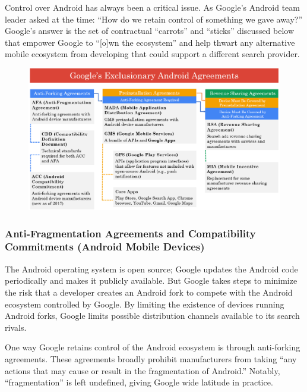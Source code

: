 \documentclass[11pt,b5paper,headings=small]{scrartcl}
\begin{document}

Control over Android has always been a critical issue. As Google’s Android team
leader asked at the time: “How do we retain control of something we gave away?” Google’s
answer is the set of contractual “carrots” and “sticks” discussed below that empower Google to
“[o]wn the ecosystem” and help thwart any alternative mobile ecosystem from developing that
could support a different search provider.
\begin{figure}
\caption{}
\includegraphics{US-v-Google-Complaint-figures/fig5.png}
\end{figure}




\subsubsection{Anti-Fragmentation Agreements and Compatibility Commitments
(Android Mobile Devices)}
The Android operating system is open source; Google updates the Android code
periodically and makes it publicly available. But Google takes steps to minimize the risk that a
developer creates an Android fork to compete with the Android ecosystem controlled by Google.
By limiting the existence of devices running Android forks, Google limits possible distribution
channels available to its search rivals.


One way Google retains control of the Android ecosystem is through anti-forking
agreements. These agreements broadly prohibit manufacturers from taking “any actions that may
cause or result in the fragmentation of Android.” Notably, “fragmentation” is left undefined,
giving Google wide latitude in practice.
\end{document}
